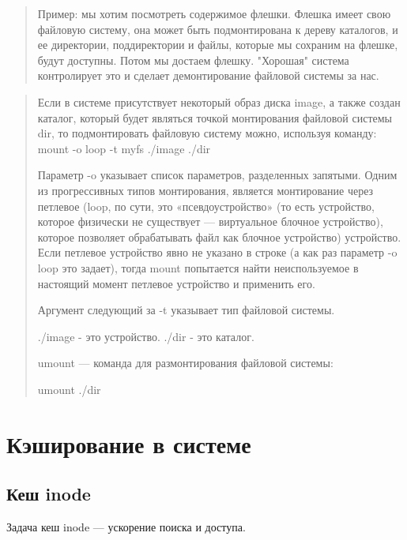 \begin{quote}
	Пример: мы хотим посмотреть содержимое флешки. Флешка имеет свою файловую систему, она может быть подмонтирована к дереву каталогов, и ее директории, поддиректории и файлы, которые мы сохраним на флешке, будут доступны. Потом мы достаем флешку. "Хорошая" система контролирует это и сделает демонтирование файловой системы за нас.
\end{quote}

\begin{quote}
	Если в системе присутствует некоторый образ диска image, а также создан каталог, который будет являться точкой монтирования файловой системы dir, то подмонтировать файловую систему можно, используя команду: mount -o loop -t myfs ./image ./dir
	
	Параметр -o указывает список параметров, разделенных запятыми. Одним из прогрессивных типов монтирования, является монтирование через петлевое (loop, по сути, это «псевдоустройство» (то есть устройство, которое физически не существует --- виртуальное блочное устройство), которое позволяет обрабатывать файл как блочное устройство) устройство. Если петлевое устройство явно не указано в строке (а как раз параметр -o loop это задает), тогда mount попытается найти неиспользуемое в настоящий момент петлевое устройство и применить его.
	
	Аргумент следующий за -t указывает тип файловой системы.
	
	./image - это устройство. ./dir - это каталог.
	
	umount — команда для размонтирования файловой системы:
	
	umount ./dir
\end{quote}

\section{Кэширование в системе}
\subsection{Кеш inode}
Задача кеш inode --- ускорение поиска и доступа.

